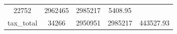 \documentclass[]{book}
\theoremstyle{definition}
\theoremstyle{definition}
\theoremstyle{definition}
\theoremstyle{remark}
\begin{document}
\begin{longtable}[]{@{}ccccc@{}}
\begin{minipage}[t]{0.12\columnwidth}
22752\strut
\end{minipage} & \begin{minipage}[t]{0.13\columnwidth}\centering\strut
2962465\strut
\end{minipage} & \begin{minipage}[t]{0.12\columnwidth}\centering\strut
2985217\strut
\end{minipage} & \begin{minipage}[t]{0.13\columnwidth}\centering\strut
5408.95\strut
\end{minipage}\tabularnewline
\begin{minipage}[t]{0.33\columnwidth}\centering\strut
tax\_total\strut
\end{minipage} & \begin{minipage}[t]{0.12\columnwidth}\centering\strut
34266\strut
\end{minipage} & \begin{minipage}[t]{0.13\columnwidth}\centering\strut
2950951\strut
\end{minipage} & \begin{minipage}[t]{0.12\columnwidth}\centering\strut
2985217\strut
\end{minipage} & \begin{minipage}[t]{0.13\columnwidth}\centering\strut
443527.93\strut
\end{minipage}\tabularnewline
\bottomrule
\end{longtable}
\end{document}

